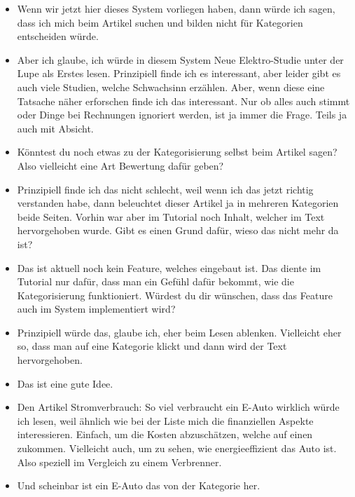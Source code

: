 {\begin{itemize}[]
            \item {} Wenn wir jetzt hier dieses System vorliegen haben, dann würde ich sagen, dass ich mich beim Artikel suchen und bilden nicht für Kategorien entscheiden würde.
            \item {} Aber ich glaube, ich würde in diesem System \flqq Neue Elektro-Studie unter der Lupe\frqq{} als Erstes lesen.
                  Prinzipiell finde ich es interessant, aber leider gibt es auch viele Studien, welche Schwachsinn erzählen.
                  Aber, wenn diese eine Tatsache näher erforschen finde ich das interessant.
                  Nur ob alles auch stimmt oder Dinge bei Rechnungen ignoriert werden, ist ja immer die Frage.
                  Teils ja auch mit Absicht.
            \item {} Könntest du noch etwas zu der Kategorisierung selbst beim Artikel sagen? Also vielleicht eine Art Bewertung dafür geben?
            \item {} Prinzipiell finde ich das nicht schlecht, weil wenn ich das jetzt richtig verstanden habe, dann beleuchtet dieser Artikel ja in mehreren Kategorien beide Seiten.
                  Vorhin war aber im Tutorial noch Inhalt, welcher im Text hervorgehoben wurde. Gibt es einen Grund dafür, wieso das nicht mehr da ist?
            \item {} Das ist aktuell noch kein Feature, welches eingebaut ist.
                  Das diente im Tutorial nur dafür, dass man ein Gefühl dafür bekommt, wie die Kategorisierung funktioniert.
                  Würdest du dir wünschen, dass das Feature auch im System implementiert wird?
            \item {} Prinzipiell würde das, glaube ich, eher beim Lesen ablenken.
                  Vielleicht eher so, dass man auf eine Kategorie klickt und dann wird der Text hervorgehoben.
            \item {} Das ist eine gute Idee.
            \item {} Den Artikel \flqq Stromverbrauch: So viel verbraucht ein E-Auto wirklich\frqq{} würde ich lesen, weil ähnlich wie bei der Liste mich die finanziellen Aspekte interessieren.
                  Einfach, um die Kosten abzuschätzen, welche auf einen zukommen.
                  Vielleicht auch, um zu sehen, wie energieeffizient das Auto ist.
                  Also speziell im Vergleich zu einem Verbrenner.
            \item {} Und scheinbar ist ein E-Auto das von der Kategorie her.

\end{itemize}}

